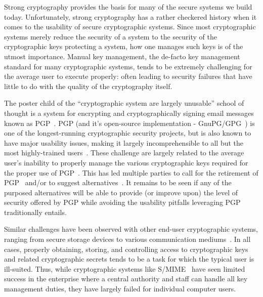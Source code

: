 Strong cryptography provides the basis for many of the secure systems
we build today. Unfortunately, strong cryptography has a rather
checkered history when it comes to the usability of secure
cryptographic systems. Since most cryptographic systems merely reduce
the security of a system to the security of the cryptographic keys
protecting a system, how one manages such keys is of the utmost
importance. Manual key management, the de-facto key management
standard for many cryptographic systems, tends to be extremely
challenging for the average user to execute properly: often leading to
security failures that have little to do with the quality of the
cryptography itself.

The poster child of the ``cryptographic system are largely unusable''
school of thought is a system for encrypting and cryptographically
signing email messages known as PGP~\cite{callas2007}. PGP (and it's
open-source implementation - GnuPG/GPG~\cite{gnupg}) is one of the
longest-running cryptographic security projects, but is also known to
have major usability issues, making it largely incomprehensible to all
but the most highly-trained users~\cite{whitten1999}. These challenge
are largely related to the average user's inability to properly manage
the various cryptographic keys required for the proper use of
PGP~\cite{green-challenge}. This has led multiple parties to call for
the retirement of PGP~\cite{green-pgp} and/or to suggest
alternatives~\cite{borisov2004, mailpile, openwhisper,
  google-endtoend}. It remains to be seen if any of the purposed
alternatives will be able to provide (or improve upon) the level of
security offered by PGP while avoiding the usability pitfalls
leveraging PGP traditionally entails.

Similar challenges have been observed with other end-user
cryptographic systems, ranging from secure storage devices to various
communication mediums~\cite{sweikata2009}. In all cases, properly
obtaining, storing, and controlling access to cryptographic keys and
related cryptographic secrets tends to be a task for which the typical
user is ill-suited. Thus, while cryptographic systems like
S/MIME~\cite{ramsdell-rfc5751} have seen limited success in the
enterprise where a central authority and staff can handle all key
management duties, they have largely failed for individual computer
users.

